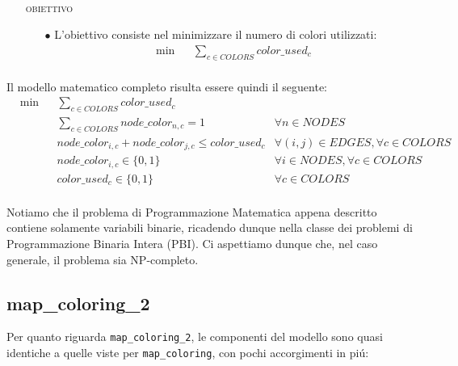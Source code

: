 \documentclass{article}
\begin{document}
\begin{itemize}
\begin{itemize}
\begin{equation*}
\begin{aligned}
	\end{aligned}
	\end{equation*}

	
	\end{itemize}


\item[] \textsc{obiettivo} 
	\begin{itemize}
	\item[$\bullet$] L'obiettivo consiste nel minimizzare il numero di colori utilizzati:\\
	\begin{equation*}
	\begin{aligned}
	& {\text{min}} & & \sum\limits_{c \in COLORS} color\_used_{c}\\
	
	\end{aligned}
	\end{equation*}

	
	\end{itemize}
\end{itemize}

Il modello matematico completo risulta essere quindi il seguente:\\

\begin{equation*}
\begin{aligned}
& {\text{min}} & & \sum\limits_{c \in COLORS} color\_used_{c} \\
& & &  \sum\limits_{c \in COLORS} node\_color_{n,c} = 1 & \forall n \in NODES\\ 
& & &  node\_color_{i,c} + node\_color_{j,c} \le color\_used_{c} & \forall (i,j) \in EDGES, \forall c \in COLORS\\
& & &  node\_color_{i,c} \in \{0, 1\} & \forall i \in NODES, \forall c \in COLORS\\
& & &  color\_used_{c} \in \{0, 1\} & \forall c \in COLORS\\

\end{aligned}
\end{equation*}

Notiamo che il problema di Programmazione Matematica appena descritto contiene solamente variabili binarie, ricadendo dunque nella classe dei problemi di Programmazione Binaria Intera (PBI). Ci aspettiamo dunque che, nel caso generale, il problema sia NP-completo.\\

\pagebreak

\subsection{map\_coloring\_2}
Per quanto riguarda \texttt{map\_coloring\_2}, le componenti del modello sono quasi identiche a quelle viste per \texttt{map\_coloring}, con pochi accorgimenti in pi\'u:\\
\end{document}
